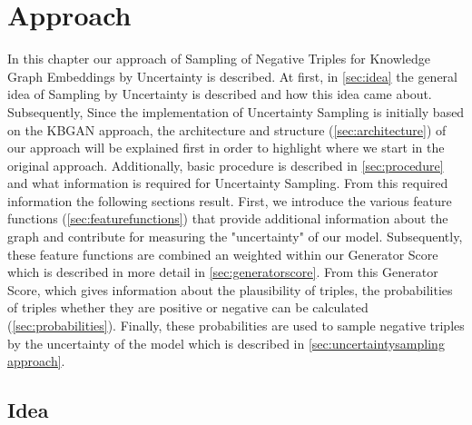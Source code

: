 \chapter{Approach}
\label{ch:approach}

In this chapter our approach of Sampling of Negative Triples for Knowledge Graph Embeddings by Uncertainty is described.
At first, in \autoref{sec:idea} the general idea of Sampling by Uncertainty is described and how this idea came about.
Subsequently, 
Since the implementation of Uncertainty Sampling is initially based on the \ac{KBGAN} approach, the architecture and structure (\autoref{sec:architecture}) of our approach will be explained first in order to highlight where we start in the original approach.
Additionally, basic procedure is described in \autoref{sec:procedure} and what information is required for Uncertainty Sampling.
From this required information the following sections result.
First, we introduce the various feature functions (\autoref{sec:featurefunctions}) that provide additional information about the graph and contribute for measuring the "uncertainty" of our model.
Subsequently, these feature functions are combined an weighted within our Generator Score which is described in more detail in \autoref{sec:generatorscore}.
From this Generator Score, which gives information about the plausibility of triples, the probabilities of triples whether they are positive or negative can be calculated (\autoref{sec:probabilities}). 
Finally, these probabilities are used to sample negative triples by the uncertainty of the model which is described in \autoref{sec:uncertaintysampling approach}.






\section{Idea} \label{sec:idea}

